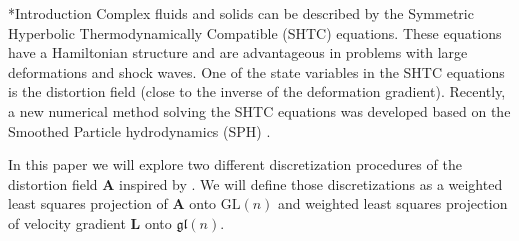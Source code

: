 \documentclass[oneside, a4paper, onecolumn, 11pt]{article}
\renewcommand{\AA}{\mathbf{A}}
\newcommand{\xx}{\mathbf{x}}
\newcommand{\XX}{\mathbf{X}}
\newcommand{\LL}{\mathbf{L}}
\newcommand{\GL}{\mathrm{GL}(n)}%
\newcommand{\gl}{\mathfrak{gl}(n)}%
\begin{document}











\newpage
\begin{section}*{Introduction}
   Complex fluids and solids can be described by the Symmetric Hyperbolic Thermodynamically Compatible (SHTC) equations. These equations have a Hamiltonian structure and are advantageous in problems with large deformations and shock waves. One of the state variables in the SHTC equations is the distortion field (close to the inverse of the deformation gradient). Recently, a new numerical method solving the SHTC equations was developed based on the Smoothed Particle hydrodynamics (SPH) \cite{kincl-unified}. 


In this paper we will explore two different discretization procedures 
of the distortion field $\AA$ inspired by \cite{hutter-pavelka}. 
We will define those discretizations as a weighted 
least squares projection of $\AA$ onto $\GL$ and 
weighted least squares projection of velocity 
gradient $\LL$ onto $\gl$.


\end{section}
\end{document}
